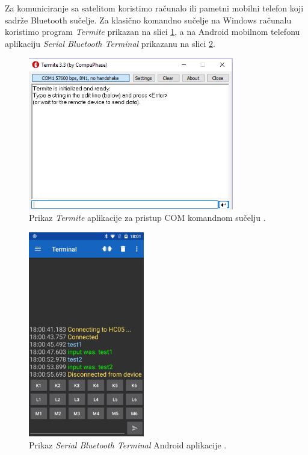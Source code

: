 \documentclass[times, utf8, diplomski, numeric]{templates/template}
\begin{document}
{{        Za komuniciranje sa satelitom koristimo računalo ili pametni mobilni telefon koji sadrže Bluetooth sučelje. Za klasično komandno sučelje na Windows računalu koristimo program \emph{Termite} \cite{termite} prikazan na slici \ref{fig:termite}, a na Android mobilnom telefonu aplikaciju \emph{Serial Bluetooth Terminal} \cite{mobilna_app} prikazanu na slici \ref{fig:mobilna_app}.

        \begin{figure}[htb]
        \centering
        \includegraphics[width=0.8\textwidth]{images/termite.png}
        \caption{Prikaz \emph{Termite} aplikacije za pristup COM komandnom sučelju \cite{termite}.}
        \label{fig:termite}
        \end{figure}

        \begin{figure}[h!]
        \centering
        \includegraphics[width=0.45\textwidth]{images/mobilna_app.png}
        \caption{Prikaz \emph{Serial Bluetooth Terminal} Android aplikacije \cite{mobilna_app}.}
        \label{fig:mobilna_app}
        \end{figure}

}}
\end{document}
